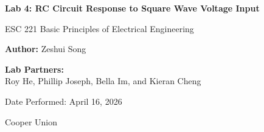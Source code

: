 \documentclass[12pt]{article}
\title{}
\date{}
\author{}
\begin{document}
\begin{titlepage}
    \centering
    \vspace*{1in}

    {\Large\bfseries Lab 4: RC Circuit Response to Square Wave Voltage Input \par}
    \vspace{1.5cm}

    {\large ESC 221 Basic Principles of Electrical Engineering \par}
    \vspace{2cm}

    {\large \textbf{Author:} Zeshui Song \par}
    \vspace{0.5cm}

    {\large \textbf{Lab Partners:}} \\
    Roy He, Phillip Joseph, Bella Im, and Kieran Cheng
    \vfill

    {\large Date Performed: April 16, 2026 \par}
    \vspace{0.8cm}

    {\large Cooper Union \par}

    \vspace*{1in}
\end{titlepage}
\newpage
\end{document}
